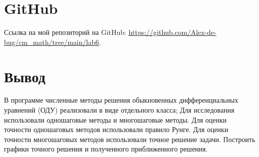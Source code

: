 \documentclass{article}
\begin{document}
\section{GitHub}
Ссылка на мой репозиторий на GitHub: \url{https://github.com/Alex-de-bug/cm_math/tree/main/lab6}.

\section{Вывод}
В программе численные методы решения обыкновенных
дифференциальных уравнений (ОДУ) реализовали в
виде отдельного класса;
Для исследования использовали одношаговые методы и
многошаговые методы.
Для оценки точности одношаговых методов использовали правило
Рунге. Для оценки точности многошаговых методов использовали точное
решение задачи. Построить графики точного решения и полученного приближенного
решения.
\end{document}
